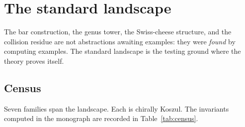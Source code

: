 \documentclass[11pt,reqno]{amsart}
\theoremstyle{definition}
\theoremstyle{remark}
\numberwithin{equation}{section}
\begin{document}
%


\section{The standard landscape}
\label{sec:landscape}

The bar construction, the genus tower, the Swiss-cheese
structure, and the collision residue are not abstractions
awaiting examples: they were \emph{found} by computing
examples. The standard landscape is the testing ground
where the theory proves itself.

\subsection{Census}
\label{ssec:census}

Seven families span the landscape. Each is chirally
Koszul. The invariants computed in the monograph are
recorded in Table~\ref{tab:census}.
\end{document}
